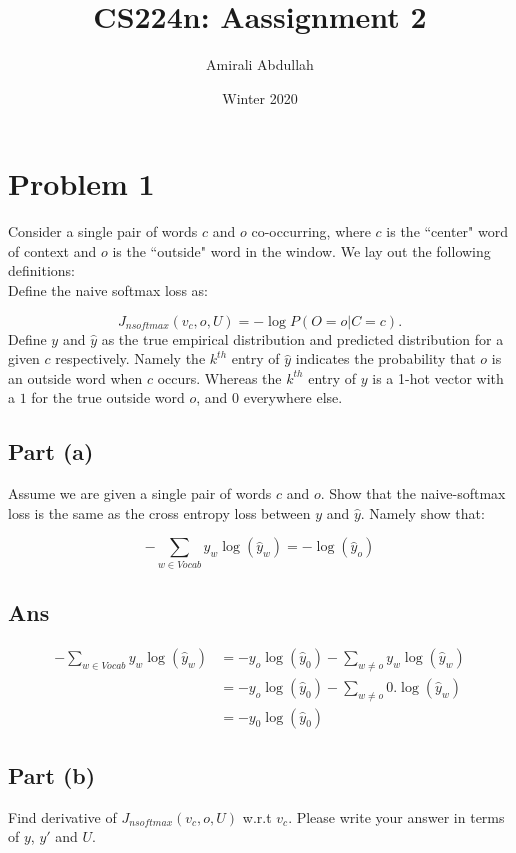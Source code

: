 \documentclass{article}
\title{CS224n: Aassignment 2}
\author{Amirali Abdullah}
\date{Winter 2020}
\begin{document}
\maketitle%

\section*{Problem 1}
Consider a single pair of words 
$c$ and $o$ co-occurring, where $c$ is the ``center" word of 
context and $o$ is the ``outside" word in the window. We lay out the following definitions:
\\ Define the naive softmax loss as:

\begin{equation}
J_{nsoftmax}(v_c, o, U) = - \log P(O=o | C=c).
\end{equation}
Define $y$ and $\hat{y}$ as the true empirical distribution and predicted distribution for a given $c$ respectively.
Namely the $k^{th}$ entry of $\hat{y}$ indicates the probability that $o$ is an outside word when $c$ occurs.
Whereas the $k^{th}$ entry of $y$ is a 1-hot vector with a $1$ for the true outside word $o$, and $0$ everywhere else.

\subsection*{Part (a)}
Assume we are given a single pair of words $c$ and $o$. Show that the naive-softmax loss is the same as 
the cross entropy loss between $y$ and $\hat{y}$.
Namely show that:

\begin{equation}
- \sum_{w \in Vocab} y_w \log(\hat{y}_w) = - \log(\hat{y}_o)
\end{equation}

\subsection*{Ans}
\begin{align*}
- \sum_{w \in Vocab} y_w \log(\hat{y}_w) &=   - y_o \log(\hat{y}_0) - \sum_{w \neq o} y_w \log (\hat{y}_w)  \\
&= - y_o \log(\hat{y}_0) - \sum_{w \neq o} 0 . \log (\hat{y}_w) \\
&=  - y_0 \log(\hat{y}_0)
\end{align*}

\subsection*{Part (b)}
Find derivative of $J_{nsoftmax}(v_c, o, U)$ w.r.t $v_c$. Please write your answer in terms of $y$, $y'$ and $U$.
\end{document}

